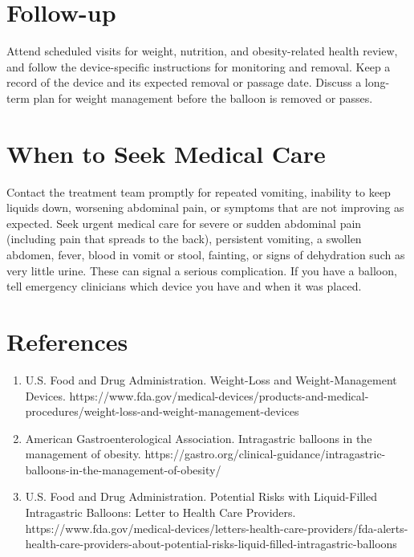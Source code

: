 \section*{Follow-up}
Attend scheduled visits for weight, nutrition, and obesity-related health review, and follow the device-specific instructions for monitoring and removal. Keep a record of the device and its expected removal or passage date. Discuss a long-term plan for weight management before the balloon is removed or passes.

\section*{When to Seek Medical Care}
Contact the treatment team promptly for repeated vomiting, inability to keep liquids down, worsening abdominal pain, or symptoms that are not improving as expected. Seek urgent medical care for severe or sudden abdominal pain (including pain that spreads to the back), persistent vomiting, a swollen abdomen, fever, blood in vomit or stool, fainting, or signs of dehydration such as very little urine. These can signal a serious complication. If you have a balloon, tell emergency clinicians which device you have and when it was placed.

\section*{References}
\begin{enumerate}
  \item U.S. Food and Drug Administration. Weight-Loss and Weight-Management Devices. https://www.fda.gov/medical-devices/products-and-medical-procedures/weight-loss-and-weight-management-devices
  \item American Gastroenterological Association. Intragastric balloons in the management of obesity. https://gastro.org/clinical-guidance/intragastric-balloons-in-the-management-of-obesity/
  \item U.S. Food and Drug Administration. Potential Risks with Liquid-Filled Intragastric Balloons: Letter to Health Care Providers. https://www.fda.gov/medical-devices/letters-health-care-providers/fda-alerts-health-care-providers-about-potential-risks-liquid-filled-intragastric-balloons
\end{enumerate}

\clearpage
